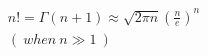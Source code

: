 \documentclass[preview]{standalone}
\begin{document}
\begin{align*}
n! = \Gamma(n+1) \approx \sqrt{2\pi n}(\frac{n}{e})^n \\ ( \ when \ n \gg 1 \ )
\end{align*}
\end{document}
